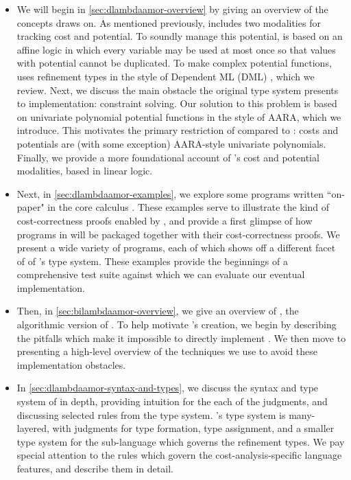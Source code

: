\begin{itemize}
 \item We will begin in \autoref{sec:dlambdaamor-overview} by giving an overview of the concepts \lambdaamor draws on. As mentioned previously, \lambdaamor includes two modalities for tracking cost and potential. To soundly manage this potential, \lambdaamor is based on an affine logic in which every variable may be used at most once so that values with potential cannot be duplicated. To make complex potential functions, \lambdaamor uses refinement types in the style of Dependent ML (DML) \cite{xi:jfp07}, which we review. Next, we discuss the main obstacle the original type system presents to implementation: constraint solving. Our solution to this problem is based on univariate polynomial potential functions in the style of AARA, which we introduce. This motivates the primary restriction of \dlambdaamor compared to \lambdaamor: costs and potentials are (with some exception) AARA-style univariate polynomials. Finally, we provide a more foundational account of \dlambdaamor's cost and potential modalities, based in linear logic.
 
 \item Next, in \autoref{sec:dlambdaamor-examples}, we explore some programs written ``on-paper" in the core calculus \dlambdaamor. These examples serve to illustrate the kind of cost-correctness proofs enabled by \dlambdaamor, and provide a first glimpse of how programs in \lambdaamorimpl will be packaged together with their cost-correctness proofs.  We present a wide variety of programs, each of which shows off a different facet of of \dlambdaamor's type system. These examples provide the beginnings of a comprehensive test suite against which we can evaluate our eventual implementation.
 
 \item Then, in \autoref{sec:bilambdaamor-overview}, we give an overview of \bilambdaamor, the algorithmic version of \dlambdaamor. To help motivate \bilambdaamor's creation, we begin by describing the pitfalls which make it impossible to directly implement \dlambdaamor. We then move to presenting a high-level overview of the techniques we use to avoid these implementation obstacles.
 
 
 \item In \autoref{sec:dlambdaamor-syntax-and-types}, we discuss the syntax and type system of \dlambdaamor in depth, providing intuition for the each of the judgments, and discussing selected rules from the type system. \dlambdaamor's type system is many-layered, with judgments for type formation, type assignment, and a smaller type system for the sub-language which governs the refinement types. We pay special attention to the rules which govern the cost-analysis-specific language features, and describe them in detail.
 

\end{itemize}
